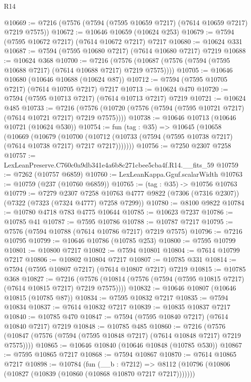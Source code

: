 \begin{lexlean}{R14}
\begin{coremodule}
@10669 := @7216 (@7576 (@7594 (@7595 @10659 @7217) (@7614 @10659 @7217) @7219 @7575))
@10672 := @10646 @10659 (@10624 @253)
@10679 := @7594 (@7595 @10672 @7217) (@7614 @10672 @7217) @7217
@10680 := @10624 @331
@10687 := @7594 (@7595 @10680 @7217) (@7614 @10680 @7217) @7219
@10688 := @10624 @368
@10700 := @7216
    (@7576 (@10687 (@7576 (@7594 (@7595 @10688 @7217) (@7614 @10688 @7217) @7219 @7575))))
@10705 := @10646 @10680 (@10646 @10688 (@10624 @87))
@10712 := @7594 (@7595 @10705 @7217) (@7614 @10705 @7217) @7217
@10713 := @10624 @470
@10720 := @7594 (@7595 @10713 @7217) (@7614 @10713 @7217) @7219
@10721 := @10624 @485
@10733 := @7216
    (@7576 (@10720 (@7576 (@7594 (@7595 @10721 @7217) (@7614 @10721 @7217) @7219 @7575))))
@10738 := @10646 @10713 (@10646 @10721 (@10624 @530))
@10754 := fun (tag : @35) =>
  @10645
    (@10658
      (@10669
        (@10679
          (@10700
            (@10712 (@10733 (@7594 (@7595 @10738 @7217) (@7614 @10738 @7217) @7217 @7217)))))))
@10756 := @7250 @2307 @7258
@10757 := LexLeanPreserve.C760c0a9db341e4a6b8c271cbee5cba4f.R14.__fits_59
@10759 := @7262 (@10757 @6859)
@10760 := LexLeanKappa.Gguf.scalarWidth
@10763 := @10759 (@237 (@10760 @6859))
@10765 := (tag : @35) -> @10756 @10763
@10779 := @7279
    @2307
    @7258
    @10763
    @4777
    @9822
    (@7306 (@7316 @2307))
    (@7322 (@7323 (@7324 @4777) @7258 @7299))
@10780 := @8100 @9822
@10784 := @10780 @4718 @783 @4775 @10644
@10785 := @10623 @7237
@10786 := @10785 @41
@10787 := @7595 @10786
@10788 := @10787 @7217
@10795 := @7576 (@7594 @10788 (@7614 @10786 @7217) @7219 @7575)
@10796 := @7216 @10795
@10799 := @10646 @10786 (@10785 @253)
@10800 := @7595 @10799
@10801 := @10800 @7217
@10802 := @7594 @10801
@10804 := @7614 @10799 @7217
@10806 := @10802 @10804 @7217
@10807 := @10785 @331
@10814 := @7594 (@7595 @10807 @7217) (@7614 @10807 @7217) @7219
@10815 := @10785 @368
@10827 := @7216
    (@7576 (@10814 (@7576 (@7594 (@7595 @10815 @7217) (@7614 @10815 @7217) @7219 @7575))))
@10832 := @10646 @10807 (@10646 @10815 (@10785 @87))
@10834 := @7595 @10832 @7217
@10835 := @7594 @10834
@10837 := @7614 @10832 @7217
@10839 := @10835 @10837 @7217
@10840 := @10785 @470
@10847 := @7594 (@7595 @10840 @7217) (@7614 @10840 @7217) @7219
@10848 := @10785 @485
@10860 := @7216
    (@7576 (@10847 (@7576 (@7594 (@7595 @10848 @7217) (@7614 @10848 @7217) @7219 @7575))))
@10865 := @10646 @10840 (@10646 @10848 (@10785 @530))
@10867 := @7595 @10865 @7217
@10868 := @7594 @10867
@10870 := @7614 @10865 @7217
@10898 := @10784
    (fun (__b : @7212) =>
    @8112 (@10796 (@10806 (@10827 (@10839 (@10860 (@10868 @10870 @7217 @7217)))))))

\end{coremodule}
\end{lexlean}

